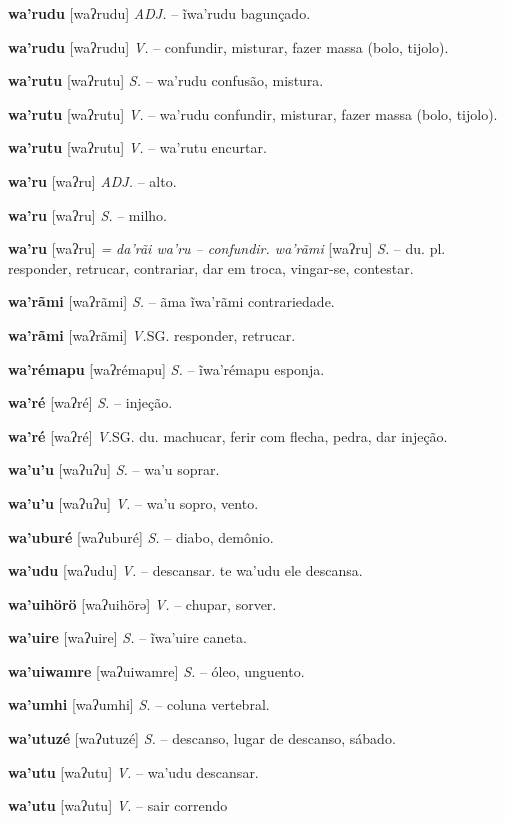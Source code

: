 {{{\textbf{wa'rudu} [waʔrudu] \textit{ADJ.} -- ĩwa'rudu bagunçado.

\textbf{wa'rudu} [waʔrudu] \textit{V.} -- confundir, misturar, fazer massa (bolo, tijolo).

\textbf{wa'rutu} [waʔrutu] \textit{S.} -- wa'rudu confusão, mistura.

\textbf{wa'rutu} [waʔrutu] \textit{V.} -- wa'rudu confundir, misturar, fazer massa (bolo, tijolo).

\textbf{wa'rutu} [waʔrutu] \textit{V.} -- wa'rutu encurtar.

\textbf{wa'ru} [waʔru] \textit{ADJ.} -- alto.

\textbf{wa'ru} [waʔru] \textit{S.} -- milho.

\textbf{wa'ru} [waʔru] \textit{= da'rãi wa'ru -- confundir. wa'rãmi} [waʔru] \textit{S.} -- du. pl. responder, retrucar, contrariar, dar em troca, vingar-se, contestar.

\textbf{wa'rãmi} [waʔrãmi] \textit{S.} -- ãma ĩwa'rãmi contrariedade.

\textbf{wa'rãmi} [waʔrãmi] \textit{V.}SG. responder, retrucar.

\textbf{wa'rémapu} [waʔrémapu] \textit{S.} -- ĩwa'rémapu esponja.

\textbf{wa'ré} [waʔré] \textit{S.} -- injeção.

\textbf{wa'ré} [waʔré] \textit{V.}SG. du. machucar, ferir com flecha, pedra, dar injeção.

\textbf{wa'u'u} [waʔuʔu] \textit{S.} -- wa'u soprar.

\textbf{wa'u'u} [waʔuʔu] \textit{V.} -- wa'u sopro, vento.

\textbf{wa'uburé} [waʔuburé] \textit{S.} -- diabo, demônio.

\textbf{wa'udu} [waʔudu] \textit{V.} -- descansar. te wa'udu ele descansa.

\textbf{wa'uihörö} [waʔuihörə] \textit{V.} -- chupar, sorver.

\textbf{wa'uire} [waʔuire] \textit{S.} -- ĩwa'uire caneta.

\textbf{wa'uiwamre} [waʔuiwamre] \textit{S.} -- óleo, unguento.

\textbf{wa'umhi} [waʔumhi] \textit{S.} -- coluna vertebral.

\textbf{wa'utuzé} [waʔutuzé] \textit{S.} -- descanso, lugar de descanso, sábado.

\textbf{wa'utu} [waʔutu] \textit{V.} -- wa'udu descansar.

\textbf{wa'utu} [waʔutu] \textit{V.} -- {sair correndo}

}}}
